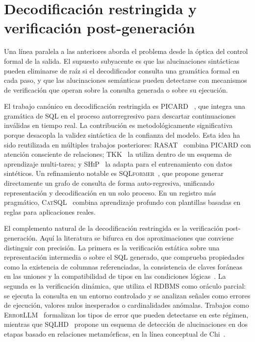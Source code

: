 \section{Decodificación restringida y verificación post-generación}
\label{sec:sota-decodificacion}

Una línea paralela a las anteriores aborda el problema desde la óptica del
control formal de la salida. El supuesto subyacente es que las alucinaciones
sintácticas pueden eliminarse de raíz si el decodificador consulta una
gramática formal en cada paso, y que las alucinaciones semánticas pueden
detectarse con mecanismos de verificación que operan sobre la consulta
generada o sobre su ejecución.

El trabajo canónico en decodificación restringida es \textsc{PICARD}~%
\cite{PICARD2022}, que integra una gramática de \ac{SQL} en el proceso
autorregresivo para descartar continuaciones inválidas en tiempo real. La
contribución es metodológicamente significativa porque desacopla la validez
sintáctica de la confianza del modelo. Esta idea ha sido reutilizada en
múltiples trabajos posteriores: \textsc{RASAT}~\cite{RASAT2022} combina
\textsc{PICARD} con atención consciente de relaciones;
\textsc{TKK}~\cite{TKK2022} la utiliza dentro de un esquema de aprendizaje
multi-tarea; y \textsc{SHiP}~\cite{SHiP2022} la adapta para el entrenamiento
con datos sintéticos. Un refinamiento notable es
\textsc{SQLformer}~\cite{SQLFormer2023}, que propone generar directamente un
grafo de consulta de forma auto-regresiva, unificando representación y
decodificación en un solo proceso. En un registro más pragmático,
\textsc{CatSQL}~\cite{CatSQL2023} combina aprendizaje profundo con
plantillas basadas en reglas para aplicaciones reales.

El complemento natural de la decodificación restringida es la verificación
post-generación. Aquí la literatura se bifurca en dos aproximaciones que
conviene distinguir con precisión. La primera es la verificación estática
sobre una representación intermedia o sobre el \ac{SQL} generado, que
comprueba propiedades como la existencia de columnas referenciadas, la
consistencia de claves foráneas en las uniones y la compatibilidad de tipos
en las condiciones lógicas~\cite{RAT-SQL2021}. La segunda es la
verificación dinámica, que utiliza el \ac{RDBMS} como oráculo parcial: se
ejecuta la consulta en un entorno controlado y se analizan señales como
errores de ejecución, valores nulos inesperados o cardinalidades anómalas.
Trabajos como \textsc{ErrorLLM}~\cite{errorllm2026} formalizan los tipos de
error que pueden detectarse en este régimen, mientras que
\textsc{SQLHD}~\cite{SQLHD2025} propone un esquema de detección de
alucinaciones en dos etapas basado en relaciones metamórficas, en la línea
conceptual de Chi~\cite{WrenAI2025}.

